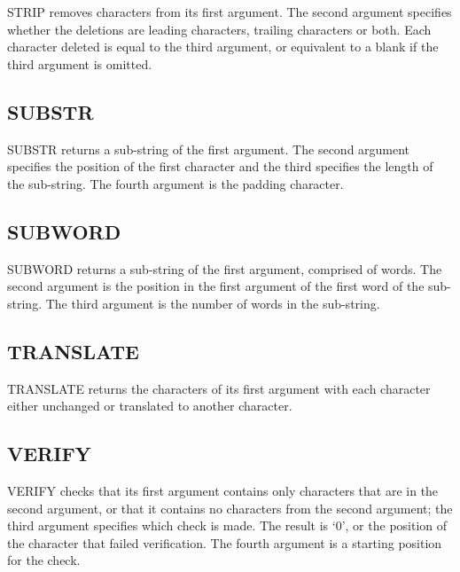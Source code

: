 STRIP removes characters from its first argument. The second argument
specifies whether the deletions are leading characters, trailing
characters or both. Each character deleted is equal to the third
argument, or equivalent to a blank if the third argument is omitted.



\subsection{SUBSTR}\label{substr}

SUBSTR returns a sub-string of the first argument. The second argument
specifies the position of the first character and the third specifies
the length of the sub-string. The fourth argument is the padding
character.



\subsection{SUBWORD}\label{subword}

SUBWORD returns a sub-string of the first argument, comprised of words.
The second argument is the position in the first argument of the first
word of the sub-string. The third argument is the number of words in the
sub-string.



\subsection{TRANSLATE}\label{translate}

TRANSLATE returns the characters of its first argument with each
character either unchanged or translated to another character.



\subsection{VERIFY}\label{verify}

VERIFY checks that its first argument contains only characters that are
in the second argument, or that it contains no characters from the
second argument; the third argument specifies which check is made. The
result is `0', or the position of the character that failed
verification. The fourth argument is a starting position for the check.

